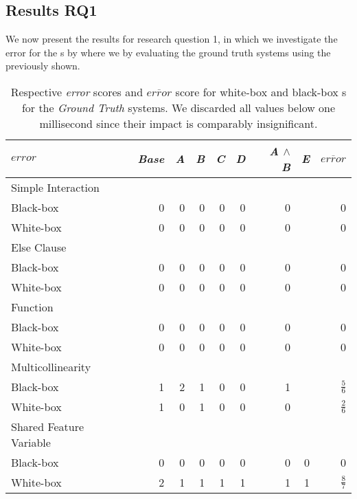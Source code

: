 \subsection*{Results RQ1}

We now present the results for research question 1, in which we investigate the error for the {\perfInfluenceModel}s by
where we by evaluating the ground truth systems using the {\perfInfluenceModel} previously
shown.

\begin{table}[H]
    \centering
    \begin{tabular}{lrrrrrrrr}    \toprule
    $error$  &  \emph{Base} & \emph{A} & \emph{B} & \emph{C} & \emph{D} & \emph{A} $\land$ \emph{B} & \emph{E} & $\overline{error}$  \\ \midrule
    Simple Interaction &  &  & &  &  &  &     \\
    Black-box & 0 & 0 & 0 & 0 & 0 & 0  &  & 0  \\
    White-box & 0 & 0 & 0 & 0 & 0 & 0  &  & 0  \\ \midrule
    Else Clause &  &  & &  &  &  &     \\
    Black-box & 0 & 0 & 0 & 0 & 0 & 0  &  & 0  \\
    White-box & 0 & 0 & 0 & 0 & 0 & 0  &  & 0  \\ \midrule
    Function &  &  & &  &  &  &     \\
    Black-box & 0 & 0 & 0 & 0 & 0 & 0  &  & 0  \\
    White-box & 0 & 0 & 0 & 0 & 0 & 0  &  & 0  \\ \midrule
    Multicollinearity &  &  & &  &  &  &     \\
    Black-box & 1 & 2 & 1 & 0 & 0 & 1  &  & $\frac{5}{6}$ \\
    White-box & 1 & 0 & 1 & 0 & 0 & 0  &  & $\frac{2}{6}$ \\ \midrule
    Shared Feature Variable &  &  & &  &  &  &     \\
    Black-box & 0 & 0 & 0 & 0 & 0 & 0  & 0 &  0 \\
    White-box & 2 & 1 & 1 & 1 & 1 & 1  & 1 &  $\frac{8}{7}$ \\ \bottomrule
    \end{tabular}
    \caption{Respective \emph{error} scores and $\overline{error}$ score for white-box and black-box {\perfInfluenceModel}s for the \emph{Ground Truth} systems. 
    We discarded all values below one millisecond since their impact is comparably insignificant.}
    \label{rq1:ground-truth-results}
\end{table}

